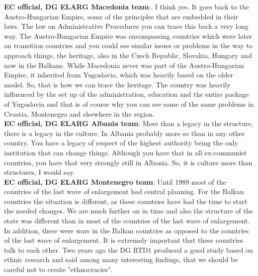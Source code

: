 \textbf{EC official, DG ELARG Macedonia team}:. I think yes. It goes back to the Austro-Hungarian Empire, some of the principles that are embedded in their laws. The law on Administrative Procedures you can trace this back a very long way. The Austro-Hungarian Empire was encompassing countries which were later on transition countries and you could see similar issues or problems in the way to approach things, the heritage, also in the Czech Republic, Slovakia, Hungary and now in the Balkans. While Macedonia never was part of the Austro-Hungarian Empire, it inherited from Yugoslavia, which was heavily based on the older model. So, that is how we can trace the heritage. The country was heavily influenced by the set up of the administration, education and the entire package of Yugoslavia and that is of course why you can see some of the same problems in Croatia, Montenegro and elsewhere in the region. \\
\textbf{EC official, DG ELARG Albania team}: More than a legacy in the structure, there is a legacy in the culture. In Albania probably more so than in any other country. You have a legacy of respect of the highest authority being the only institution that can change things. Although you have that in all ex-communist countries, you have that very strongly still in Albania. So, it is culture more than structures, I would say.\\
\textbf{EC official, DG ELARG Montenegro team}: Until 1989 most of the countries of the last wave of enlargement had central planning. For the Balkan countries the situation is different, as these countries have had the time to start the needed changes. We are much further on in time and also the structure of the state was different than in most of the countries of the last wave of enlargement. In addition, there were wars in the Balkan countries as opposed to the countries of the last wave of enlargement. It is extremely important that these countries talk to each other. Two years ago the DG RTD1 produced a good study based on ethnic research and said among many interesting findings, that we should be careful not to create "ethnocracies".\\
